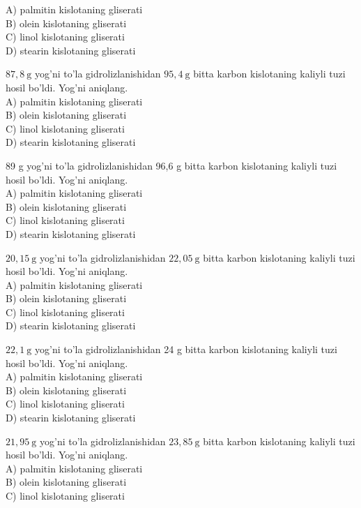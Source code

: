A) palmitin kislotaning gliserati\\
B) olein kislotaning gliserati\\
C) linol kislotaning gliserati\\
D) stearin kislotaning gliserati
  \item $87,8 \mathrm{~g}$ yog'ni to'la gidrolizlanishidan $95,4 \mathrm{~g}$ bitta karbon kislotaning kaliyli tuzi hosil bo'ldi. Yog'ni aniqlang.\\
A) palmitin kislotaning gliserati\\
B) olein kislotaning gliserati\\
C) linol kislotaning gliserati\\
D) stearin kislotaning gliserati
  \item 89 g yog'ni to'la gidrolizlanishidan 96,6 g bitta karbon kislotaning kaliyli tuzi hosil bo'ldi. Yog'ni aniqlang.\\
A) palmitin kislotaning gliserati\\
B) olein kislotaning gliserati\\
C) linol kislotaning gliserati\\
D) stearin kislotaning gliserati
  \item $20,15 \mathrm{~g}$ yog'ni to'la gidrolizlanishidan $22,05 \mathrm{~g}$ bitta karbon kislotaning kaliyli tuzi hosil bo'ldi. Yog'ni aniqlang.\\
A) palmitin kislotaning gliserati\\
B) olein kislotaning gliserati\\
C) linol kislotaning gliserati\\
D) stearin kislotaning gliserati
  \item $22,1 \mathrm{~g}$ yog'ni to'la gidrolizlanishidan 24 g bitta karbon kislotaning kaliyli tuzi hosil bo'ldi. Yog'ni aniqlang.\\
A) palmitin kislotaning gliserati\\
B) olein kislotaning gliserati\\
C) linol kislotaning gliserati\\
D) stearin kislotaning gliserati
  \item $21,95 \mathrm{~g}$ yog'ni to'la gidrolizlanishidan $23,85 \mathrm{~g}$ bitta karbon kislotaning kaliyli tuzi hosil bo'ldi. Yog'ni aniqlang.\\
A) palmitin kislotaning gliserati\\
B) olein kislotaning gliserati\\
C) linol kislotaning gliserati\\
